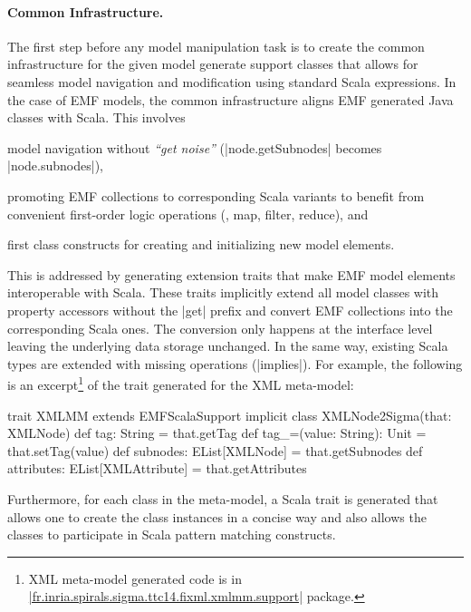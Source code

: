 \paragraph{Common Infrastructure.} 
%
The first step before any \SIGMA model manipulation task is to create the common infrastructure for the given model \Ie generate support classes that allows for seamless model navigation and modification using standard Scala expressions.
In the case of EMF models, the common infrastructure aligns EMF generated Java classes with Scala.
This involves
%
\begin{inparaitem}[]
  \item model navigation without \emph{``get noise''} (\Eg \Scala|node.getSubnodes| becomes \Scala|node.subnodes|),
  \item promoting EMF collections to corresponding Scala variants to benefit from convenient first-order logic operations (\Eg, map, filter, reduce), and
  \item first class constructs for creating and initializing new model elements.
\end{inparaitem}

This is addressed by generating extension traits that make EMF model elements interoperable with Scala.
These traits implicitly extend all model classes with property accessors without the \Scala|get| prefix and convert EMF collections into the corresponding Scala ones.
The conversion only happens at the interface level leaving the underlying data storage unchanged.
In the same way, existing Scala types are extended with missing operations (\Eg \Scala|implies|).
For example, the following is an excerpt\footnote{XML meta-model generated code is in \href{https://github.com/fikovnik/ttc14-fixml-sigma/tree/master/ttc14-fixml-base/src-gen/fr/inria/spirals/sigma/ttc14/fixml/xmlmm/support}{\Scala|fr.inria.spirals.sigma.ttc14.fixml.xmlmm.support|} package.} of the trait generated for the XML meta-model: 
%
\begin{scalacode}
trait XMLMM extends EMFScalaSupport { 
  implicit class XMLNode2Sigma(that: XMLNode) {
    def tag: String = that.getTag
    def tag_=(value: String): Unit = that.setTag(value)
    def subnodes: EList[XMLNode] = that.getSubnodes
    def attributes: EList[XMLAttribute] = that.getAttributes
  }
}
\end{scalacode}
%
Furthermore, for each class in the meta-model, a Scala trait is generated that allows one to create the class instances in a concise way and also allows the classes to participate in Scala pattern matching constructs.

